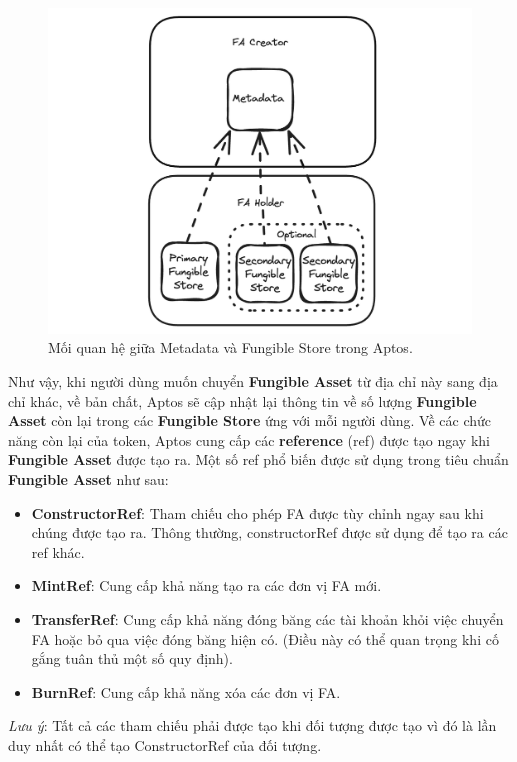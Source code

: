 \begin{figure}[H]
    \begin{center}
        \includegraphics[width=1\textwidth]{figures/c1/fa-diagram-light.png}
        \caption{Mối quan hệ giữa Metadata và Fungible Store trong Aptos.~\cite{FA}}
        \label{fig:feature_interaction_example}
    \end{center}
\end{figure}
\hspace{-1cm}Như vậy, khi người dùng muốn chuyển \textbf{Fungible Asset} từ địa
chỉ này sang địa chỉ khác, về bản chất, Aptos sẽ cập nhật lại thông tin về số
lượng \textbf{Fungible Asset} còn lại trong các \textbf{Fungible Store} ứng với
mỗi người dùng. Về các chức năng còn lại của token, Aptos cung cấp các
\textbf{reference} (ref) được tạo ngay khi \textbf{Fungible Asset} được tạo ra.
Một số ref phổ biến được sử dụng trong tiêu chuẩn \textbf{Fungible Asset} như
sau:

\begin{itemize}
    \item \textbf{ConstructorRef}: Tham chiếu cho phép FA được tùy chỉnh ngay
          sau khi chúng được tạo ra. Thông thường, constructorRef được sử dụng
          để tạo ra
          các ref khác.

    \item \textbf{MintRef}: Cung cấp khả năng tạo ra các đơn vị FA mới.

    \item \textbf{TransferRef}: Cung cấp khả năng đóng băng các tài khoản khỏi
          việc chuyển FA hoặc bỏ qua việc đóng băng hiện có. (Điều này có thể
          quan trọng
          khi cố gắng tuân thủ một số quy định).

    \item \textbf{BurnRef}: Cung cấp khả năng xóa các đơn vị FA.
\end{itemize}
\textit{Lưu ý}: Tất cả các tham chiếu phải được tạo khi đối tượng được tạo vì
đó là lần duy nhất có thể tạo ConstructorRef của đối tượng.

